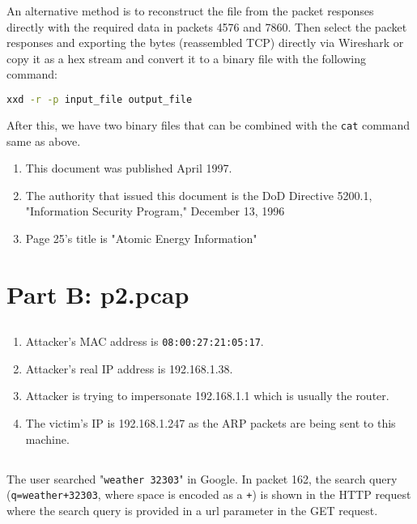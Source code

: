 \documentclass[12pt]{exam}
\begin{document}
An alternative method is to reconstruct the file from the packet responses
directly with the required data in packets 4576 and 7860.  Then select the
packet responses and exporting the bytes (reassembled TCP) directly via
Wireshark or copy it as a hex stream and convert it to a binary file with the
following command:

\begin{lstlisting}[language=bash]
    xxd -r -p input_file output_file
\end{lstlisting}

After this, we have two binary files that can be combined with the
\lstinline{cat} command same as above.

\begin{enumerate}[label=\alph*)]
    \item This document was published April 1997.
    \item The authority that issued this document is the DoD Directive 5200.1,
    "Information Security Program," December 13, 1996
    \item Page 25's title is "Atomic Energy Information"
\end{enumerate}

\section{Part B: p2.pcap}

\subsection{}

\begin{enumerate}[label=\alph*)]
    \item Attacker's MAC address is \lstinline{08:00:27:21:05:17}.
    \item Attacker's real IP address is 192.168.1.38.
    \item Attacker is trying to impersonate 192.168.1.1 which is usually the
    router.
    \item The victim's IP is 192.168.1.247 as the ARP packets are being sent to
    this machine.
\end{enumerate}

\subsection{}

The user searched "\lstinline{weather 32303}" in Google.  In packet 162, the
search query (\lstinline{q=weather+32303}, where space is encoded as a
\lstinline{+}) is shown in the HTTP request where the search query is provided
in a url parameter in the GET request.
\end{document}
